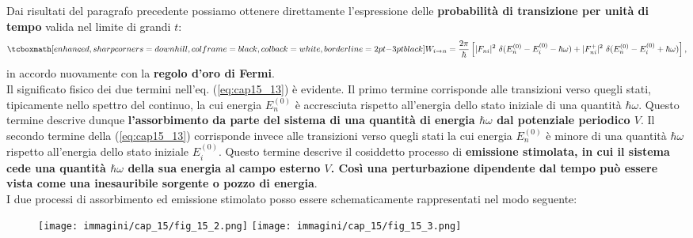 Dai risultati del paragrafo precedente possiamo ottenere direttamente l'espressione delle \textbf{probabilità di transizione per unità di tempo} valida nel limite di grandi $t$:
	\begin{align}
		\tcboxmath[enhanced, sharp corners=downhill, colframe=black, colback=white, borderline={2pt}{-3pt}{black}]{
			W_{i\rightarrow n} = \frac{2\pi}{\hbar}\left[ \vert F_{ni}\vert ^2 \ \delta (E_n^{(0)}-E_i^{(0)}-\hbar \omega) + \vert F_{ni} ^+\vert ^2 \ \delta (E_n^{(0)}-E_i^{(0)}+\hbar \omega)\right],
			} \nonumber \\[-0.5cm]
			\,
	\label{eq:cap15_13}
	\end{align}
in accordo nuovamente con la \textbf{regolo d'oro di Fermi}.\\

Il significato fisico dei due termini nell'eq. (\ref{eq:cap15_13}) è evidente. Il primo termine corrisponde alle transizioni verso quegli stati, tipicamente nello spettro del continuo, la cui energia $E_n ^{(0)}$ è accresciuta rispetto all'energia dello stato iniziale di una quantità $\hbar \omega$. Questo termine descrive dunque \textbf{l'assorbimento da parte del sistema di una quantità di energia $\hbar \omega$ dal potenziale periodico $V$}. Il secondo termine della (\ref{eq:cap15_13}) corrisponde invece alle transizioni verso quegli stati la cui energia $E_n ^{(0)}$ è minore di una quantità $\hbar \omega$ rispetto all'energia dello stato iniziale $E_i ^{(0)}$. Questo termine descrive il cosiddetto processo di \textbf{emissione stimolata, in cui il sistema cede una quantità $\hbar \omega$ della sua energia al campo esterno $V$. Così una perturbazione dipendente dal tempo può essere vista come una inesauribile sorgente o pozzo di energia}.\\
I due processi di assorbimento ed emissione stimolato posso essere schematicamente rappresentati nel modo seguente:
\begin{figure}[!htbp]
\begin{center}
\texttt{[image: immagini/cap\_15/fig\_15\_2.png]}\hspace{1cm}
\texttt{[image: immagini/cap\_15/fig\_15\_3.png]}
\end{center}
\end{figure}
